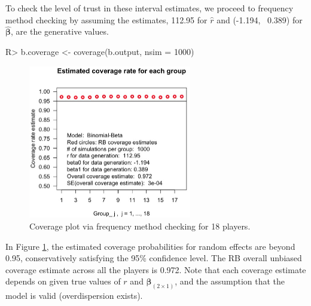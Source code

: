 \documentclass[article]{jss}
\begin{document}
To check the level of trust in these interval estimates, we  proceed to frequency method checking by assuming the estimates, 112.95 for $\hat{r}$ and (-1.194, ~0.389) for $\hat{\boldsymbol{\beta}}$, are the generative values. 

\begin{CodeChunk}
\begin{CodeInput}
R> b.coverage <- coverage(b.output, nsim = 1000) 
\end{CodeInput}
\end{CodeChunk}
\begin{figure}[h!]
\begin{center}
\includegraphics[width = 2.8in]{baseball2.png}
\caption{Coverage plot via frequency method checking for 18 players.}
\label{fig:baseball2}
\end{center}
\end{figure}



In Figure \ref{fig:baseball2},  the estimated coverage probabilities for random effects are beyond 0.95, conservatively satisfying the 95\% confidence level. The RB overall unbiased coverage estimate across all the players is 0.972. Note that each coverage estimate depends on given true values of $r$ and $\boldsymbol{\beta}_{(2\times1)}$, and the assumption that the model is valid (overdispersion exists).
\end{document}
